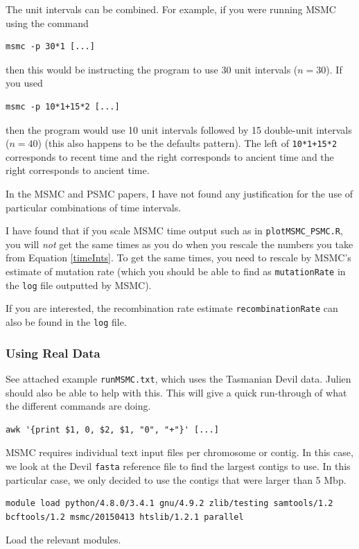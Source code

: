\documentclass[11pt,a4paper]{article}
\begin{document}
The unit intervals can be combined. For example, if you were running MSMC using the command 
\begin{lstlisting}
msmc -p 30*1 [...]
\end{lstlisting}
then this would be instructing the program to use 30 unit intervals ($n = 30$). If you used 
\begin{lstlisting}
msmc -p 10*1+15*2 [...]
\end{lstlisting}
then the program would use 10 unit intervals followed by 15 double-unit intervals ($n = 40$) (this also happens to be the defaults pattern). The left of \texttt{10*1+15*2} corresponds to recent time and the right corresponds to ancient time and the right corresponds to ancient time.

In the MSMC and PSMC papers, I have not found any justification for the use of particular combinations of time intervals.

I have found that if you scale MSMC time output such as in \texttt{plotMSMC\_PSMC.R}, you will \emph{not} get the same times as you do when you rescale the numbers you take from Equation \ref{timeInts}. To get the same times, you need to rescale by MSMC's estimate of mutation rate (which you should be able to find as \texttt{mutationRate} in the \texttt{log} file outputted by MSMC).

If you are interested, the recombination rate estimate \texttt{recombinationRate} can also be found in the \texttt{log} file.

\subsubsection{Using Real Data}
See attached example \texttt{runMSMC.txt}, which uses the Tasmanian Devil data. Julien should also be able to help with this. This will give a quick run-through of what the different commands are doing.

\begin{lstlisting}
awk '{print $1, 0, $2, $1, "0", "+"}' [...]
\end{lstlisting}
MSMC requires individual text input files per chromosome or contig. In this case, we look at the Devil \texttt{fasta} reference file to find the largest contigs to use. In this particular case, we only decided to use the contigs that were larger than 5 Mbp.

\begin{lstlisting}
module load python/4.8.0/3.4.1 gnu/4.9.2 zlib/testing samtools/1.2 bcftools/1.2 msmc/20150413 htslib/1.2.1 parallel
\end{lstlisting}
Load the relevant modules.
\end{document}
